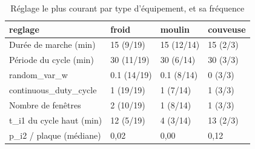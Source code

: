 \begin{table}[htbp]
\caption{Réglage le plus courant par type d'équipement, et sa fréquence}
\label{tab:transfert_reglages}
\begin{tabular}{llll}
\toprule
reglage & froid & moulin & couveuse \\
\midrule
Durée de marche (min) & 15 (9/19) & 15 (12/14) & 15 (2/3) \\
Période du cycle (min) & 30 (11/19) & 30 (6/14) & 30 (3/3) \\
random\_var\_w & 0.1 (14/19) & 0.1 (8/14) & 0 (3/3) \\
continuous\_duty\_cycle & 1 (19/19) & 1 (7/14) & 1 (3/3) \\
Nombre de fenêtres & 2 (10/19) & 1 (8/14) & 1 (3/3) \\
t\_i1 du cycle haut (min) & 12 (5/19) & 4 (3/14) & 13 (2/3) \\
p\_i2 / plaque (médiane) & 0,02 & 0,00 & 0,12 \\
\bottomrule
\end{tabular}
\end{table}
